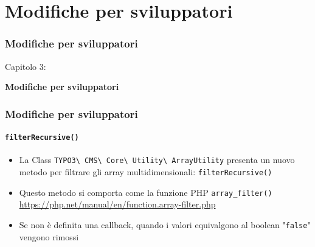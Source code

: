 %

\section{Modifiche per sviluppatori}
\begin{frame}[fragile]
	\frametitle{Modifiche per sviluppatori}

	\begin{center}\huge{Capitolo 3:}\end{center}
	\begin{center}\huge{\color{typo3darkgrey}\textbf{Modifiche per sviluppatori}}\end{center}

\end{frame}


\begin{frame}[fragile]
	\frametitle{Modifiche per sviluppatori}
	\framesubtitle{\texttt{filterRecursive()}}

	\begin{itemize}
		\item La Class
			\texttt{TYPO3\textbackslash
				CMS\textbackslash
				Core\textbackslash
				Utility\textbackslash
				ArrayUtility}\newline
			presenta un nuovo metodo per filtrare gli array multidimensionali:\newline
			\texttt{filterRecursive()}
		\item Questo metodo si comporta come la funzione PHP \texttt{array\_filter()}\newline
			\small
				\href{https://php.net/manual/en/function.array-filter.php}{https://php.net/manual/en/function.array-filter.php}
			\normalsize
		\item Se non è definita una callback, quando i valori equivalgono al boolean "\texttt{false}" vengono rimossi
	\end{itemize}

\end{frame}

